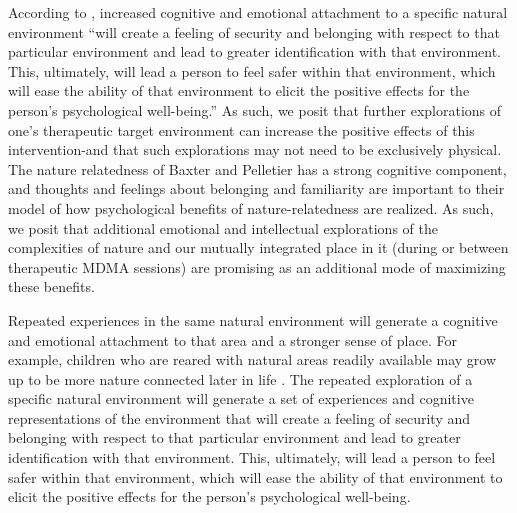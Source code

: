 \documentclass[12pt,letterpaper]{article}
\begin{document}
According to \textcite{baxterNatureRelatedness}, increased cognitive and emotional attachment to a specific natural environment “will create a feeling of security and belonging with respect to that particular environment and lead to greater identification with that environment. This, ultimately, will lead a person to feel safer within that environment, which will ease the ability of that environment to elicit the positive effects for the person's psychological well-being.” As such, we posit that further explorations of one's therapeutic target environment can increase the positive effects of this intervention-and that such explorations may not need to be exclusively physical. The nature relatedness of Baxter and Pelletier has a strong cognitive component, and thoughts and feelings about belonging and familiarity are important to their model of how psychological benefits of nature-relatedness are realized. As such, we posit that additional emotional and intellectual explorations of the complexities of nature and our mutually integrated place in it (during or between therapeutic MDMA sessions) are promising as an additional mode of maximizing these benefits.

Repeated experiences in the same natural environment will generate a cognitive and emotional attachment to that area and a stronger sense of place. For example, children who are reared with natural areas readily available may grow up to be more nature connected later in life \cite{windhorst2015growing}. The repeated exploration of a specific natural environment will generate a set of experiences and cognitive representations of the environment that will create a feeling of security and belonging with respect to that particular environment and lead to greater identification with that environment. This, ultimately, will lead a person to feel safer within that environment, which will ease the ability of that environment to elicit the positive effects for the person's psychological well-being.

\end{document}
